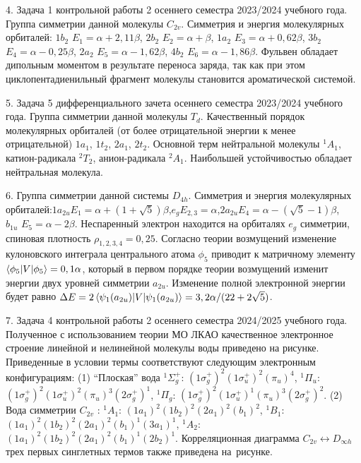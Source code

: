 4. Задача 1 контрольной работы 2 осеннего семестра 2023/2024 учебного года. Группа симметрии данной молекулы $C_{2v}$. Симметрия и энергия молекулярных орбиталей: $1b_2$ $E_1=\alpha+2,11\beta$, $2b_2$ $E_2=\alpha+\beta$, $1a_2$ $E_3=\alpha+0,62\beta$, $3b_2$ $E_4=\alpha-0,25\beta$, $2a_2$ $E_5=\alpha-1,62\beta$, $4b_2$ $E_6=\alpha-1,86\beta$. Фульвен обладает дипольным моментом в результате переноса заряда, так как при этом циклопентадиенильный фрагмент молекулы становится ароматической системой.\par
5. Задача 5 дифференциального зачета осеннего семестра 2023/2024 учебного года. Группа симметрии данной молекулы $T_{d}$. Качественный порядок молекулярных орбиталей (от более отрицательной энергии к менее отрицательной) $1a_1$, $1t_2$, $2a_1$, $2t_2$. Основной терм нейтральной молекулы $^1A_1$, катион-радикала $^2T_2$, анион-радикала $^2A_1$. Наибольшей устойчивостью обладает нейтральная молекула.\par
6. Группа симметрии данной системы $D_{4h}$. Симметрия и энергия молекулярных орбиталей:\hspace{\fill}$1a_{2u}$\hspace{\fill}$E_1=\alpha+(1+\sqrt5)\beta$,\hspace{\fill}$e_g$\hspace{\fill}$E_{2,3}=\alpha$,\hspace{\fill}$2a_{2u}$\hspace{\fill}$E_4=\alpha-(\sqrt5-1)\beta$,\\ $b_{1u}$ $E_5=\alpha-2\beta$. Неспаренный электрон находится на орбиталях $e_g$ симметрии, спиновая плотность $\rho_{1,2,3,4}=0,25$. Согласно теории возмущений изменение кулоновского интеграла центрального атома $\phi_5$ приводит к матричному элементу $\braket{\phi_5|V|\phi_5}=0,1\alpha$, который в первом порядке теории возмущений изменит энергии двух уровней симметрии $a_{2u}$. Изменение полной электронной энергии будет равно $\Delta E=2\braket{\psi_1(a_{2u})|V|\psi_1(a_{2u})}=3,2\alpha/(22+2\sqrt5)$.\par
7. Задача 4 контрольной работы 2 осеннего семестра 2024/2025 учебного года. Полученное с использованием теории МО ЛКАО качественное электронное строение линейной и нелинейной молекулы воды приведено на рисунке. Приведенные в условии термы соответствуют следующим электронным конфигурациям: (1) “Плоская” вода $^1\Sigma_g^+$: $(1\sigma_g^+)^2 (1\sigma_u^+)^2 (\pi_u)^4$, $^1\Pi_u$: $(1\sigma_g^+)^2 (1\sigma_u^+ )^2 (\pi_u )^3 (2\sigma_g^+ )^1$, $^1\Pi_g$: $(1\sigma_g^+)^2 (1\sigma_u^+)^1 (\pi_u )^3 (2\sigma_g^+ )^2$. (2) Вода симметрии $C_{2v}$ : $^1A_1$: $(1a_1 )^2 (1b_2 )^2 (2a_1 )^2 (b_1 )^2$, $^1B_1$: $(1a_1 )^2 (1b_2 )^2 (2a_1 )^2 (b_1 )^1  (3a_1  )^1$, $^1A_2$: $(1a_1 )^2 (1b_2 )^2 (2a_1 )^2 (b_1 )^1 (2b_2)^1$. Корреляционная диаграмма $C_{2v} \leftrightarrow D_{\infty h}$ трех первых синглетных термов также приведена на~рисунке.
